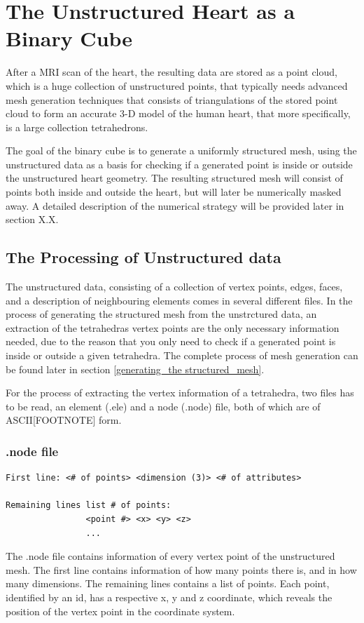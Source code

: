 \chapter{The Unstructured Heart as a Binary Cube} 
After a MRI scan of the heart, the resulting data are stored as a point cloud, which is a huge collection of unstructured points, that typically needs advanced mesh generation techniques that consists of triangulations of the stored point cloud to form an accurate 3-D model of the human heart, that more specifically, is a large collection tetrahedrons. 

The goal of the binary cube is to generate a uniformly structured mesh, using the unstructured data as a basis for checking if a generated point is inside or outside the unstructured heart geometry. The resulting structured mesh will consist of points both inside and outside the heart, but will later be numerically masked away. A detailed description of the numerical strategy will be provided later in section X.X.

\section{The Processing of Unstructured data}
The unstructured data, consisting of a collection of vertex points, edges, faces, and a description of neighbouring elements comes in several different files. In the process of generating the structured mesh from the unstrctured data, an extraction of the tetrahedras vertex points are the only necessary information needed, due to the reason that you only need to check if a generated point is inside or outside a given tetrahedra. The complete process of mesh generation can be found later in section \ref{generating_the structured_mesh}.

For the process of extracting the vertex information of a tetrahedra, two files has to be read, an element (.ele) and a node (.node) file, both of which are of ASCII[FOOTNOTE] form.

\subsection{.node file}
\begin{lstlisting}[caption=.node file]
First line:	<# of points> <dimension (3)> <# of attributes>

Remaining lines list # of points:
				<point #> <x> <y> <z> 
				...
\end{lstlisting}
The .node file contains information of every vertex point of the unstructured mesh. The first line contains information of how many points there is, and in how many dimensions. The remaining lines contains a list of points. Each point, identified by an id, has a respective x, y and z coordinate, which reveals the position of the vertex point in the coordinate system.

